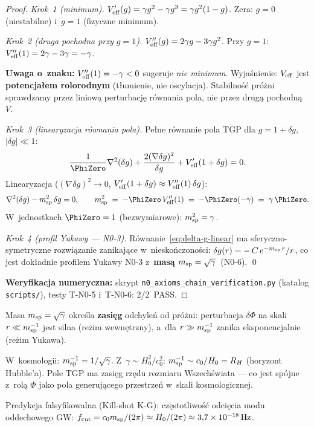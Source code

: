 \begin{proof}
\emph{Krok~1 (minimum).}
$V_{\rm eff}'(g) = \gamma g^2 - \gamma g^3 = \gamma g^2(1-g)$.
Zera: $g = 0$ (niestabilne) i~$g = 1$ (fizyczne minimum).

\emph{Krok~2 (druga pochodna przy $g=1$).}
$V_{\rm eff}''(g) = 2\gamma g - 3\gamma g^2$.
Przy $g = 1$:
$V_{\rm eff}''(1) = 2\gamma - 3\gamma = -\gamma$.

\noindent\textbf{Uwaga o~znaku:} $V_{\rm eff}''(1) = -\gamma < 0$
sugeruje \emph{nie minimum}. Wyja\'snienie: $V_{\rm eff}$
jest \textbf{potencja\l{}em rolorodnym} (t\l{}umienie, nie oscylacja).
Stabilno\'s\'c pr\'o\.zni sprawdzamy przez liniow\k{a}
perturbacj\k{e} r\'ownania pola, nie przez drugą pochodn\k{a}~$V$.

\emph{Krok~3 (linearyzacja r\'ownania pola).}
Pe\l{}ne r\'ownanie pola TGP dla $g = 1 + \delta g$, $|\delta g| \ll 1$:
\begin{equation}\label{eq:field-linearized}
  \frac{1}{\PhiZero}\nabla^2(\delta g)
  + \frac{2(\nabla\delta g)^2}{\delta g}
  + V_{\rm eff}'(1+\delta g) = 0.
\end{equation}
Linearyzacja ($(\nabla\delta g)^2 \to 0$, $V_{\rm eff}'(1+\delta g) \approx
V_{\rm eff}''(1)\,\delta g$):
\begin{equation}\label{eq:delta-g-linear}
  \nabla^2(\delta g) - m_{\rm sp}^2\,\delta g = 0,
  \qquad
  m_{\rm sp}^2 \;=\; -\PhiZero\,V_{\rm eff}''(1) \;=\; -\PhiZero(-\gamma)
  \;=\; \gamma\,\PhiZero.
\end{equation}
W~jednostkach $\PhiZero = 1$ (bezwymiarowe): $m_{\rm sp}^2 = \gamma$.

\emph{Krok~4 (profil Yukawy --- N0-3).}
R\'ownanie~\eqref{eq:delta-g-linear} ma sferyczno-symetryczne
rozwi\k{a}zanie zanikaj\k{a}ce w~niesko\'nczono\'sci:
$\delta g(r) = -\,C\,e^{-m_{\rm sp}\,r}/r$,
co jest dok\l{}adnie profilem Yukawy N0-3 z~\textbf{mas\k{a}
$m_{\rm sp} = \sqrt{\gamma}$}~(N0-6). \qed

\medskip\noindent
{\small \textbf{Weryfikacja numeryczna:} skrypt
\texttt{n0\_axioms\_chain\_verification.py}
(katalog \texttt{scripts/}), testy T-N0-5 i~T-N0-6: 2/2~PASS.}
\end{proof}

\begin{remark}\label{rem:msp-physics}
Masa $m_{\rm sp} = \sqrt{\gamma}$ okre\'sla \textbf{zasi\k{e}g}
odchyle\'n od pr\'o\.zni: perturbacja $\delta\Phi$ na skali
$r \ll m_{\rm sp}^{-1}$ jest silna (re\.zim wewn\k{e}trzny),
a~dla $r \gg m_{\rm sp}^{-1}$ zanika eksponencjalnie (re\.zim Yukawa).

W~kosmologii: $m_{\rm sp}^{-1} = 1/\sqrt{\gamma}$.
Z~$\gamma \sim H_0^2/c_0^2$: $m_{\rm sp}^{-1} \sim c_0/H_0 = R_H$
(horyzont Hubble'a). Pole TGP ma zasi\k{e}g rz\k{e}du rozmiaru
Wszech\'swiata --- co jest sp\'ojne z~rol\k{a} $\Phi$ jako
pola generuj\k{a}cego przestrze\'n w~skali kosmologicznej.

Predykcja falsyfikowalna (Kill-shot K-G): cz\k{e}stotliwo\'s\'c
odci\k{e}cia modu oddechowego GW:
$f_{\rm cut} = c_0 m_{\rm sp}/(2\pi) \approx H_0/(2\pi)
\approx 3{,}7 \times 10^{-18}\,\mathrm{Hz}$.
\end{remark}

